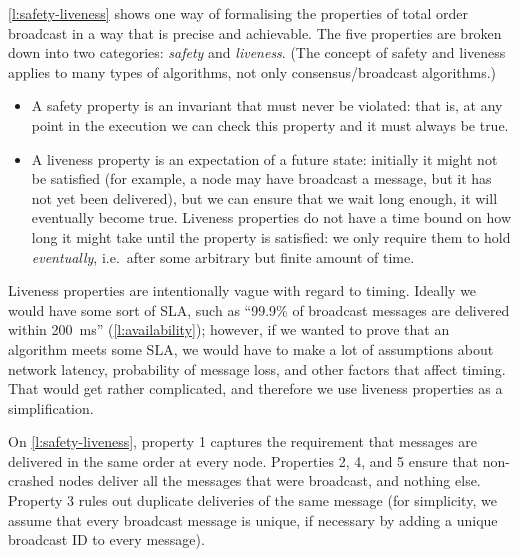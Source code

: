 \autoref{l:safety-liveness} shows one way of formalising the properties of total order broadcast in a way that is precise and achievable.
The five properties are broken down into two categories: \emph{safety} and \emph{liveness}.
(The concept of safety and liveness applies to many types of algorithms, not only consensus/broadcast algorithms.)

\begin{itemize}
    \item A safety property is an invariant that must never be violated: that is, at any point in the execution we can check this property and it must always be true.
    \item A liveness property is an expectation of a future state: initially it might not be satisfied (for example, a node may have broadcast a message, but it has not yet been delivered), but we can ensure that we wait long enough, it will eventually become true.
        Liveness properties do not have a time bound on how long it might take until the property is satisfied: we only require them to hold \emph{eventually}, i.e.\ after some arbitrary but finite amount of time.
\end{itemize}

Liveness properties are intentionally vague with regard to timing.
Ideally we would have some sort of SLA, such as ``99.9\% of broadcast messages are delivered within 200~ms'' (\autoref{l:availability}); however, if we wanted to prove that an algorithm meets some SLA, we would have to make a lot of assumptions about network latency, probability of message loss, and other factors that affect timing.
That would get rather complicated, and therefore we use liveness properties as a simplification.

On \autoref{l:safety-liveness}, property 1 captures the requirement that messages are delivered in the same order at every node.
Properties 2, 4, and 5 ensure that non-crashed nodes deliver all the messages that were broadcast, and nothing else.
Property 3 rules out duplicate deliveries of the same message (for simplicity, we assume that every broadcast message is unique, if necessary by adding a unique broadcast ID to every message).


